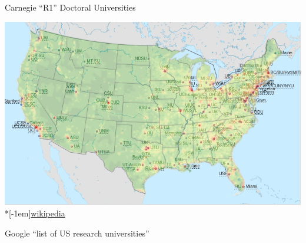 \begin{frame}[fragile]{Carnegie ``R1'' 
    Doctoral Universities}
\begin{center}
\includegraphics[width=\textwidth]{r1map-density-overlay1}\\*[-1em]\hfill{\tiny \href{https://en.wikipedia.org/wiki/List_of_research_universities_in_the_United_States}{wikipedia}}

Google ``list of US research universities''

\end{center}
\end{frame}

